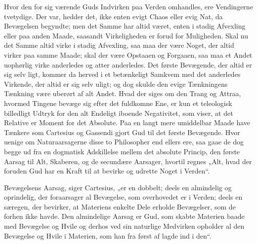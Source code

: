 \documentclass[12pt,a4paper]{book}
\begin{document}
Hvor den for sig værende Guds Indvirken paa Verden omhandles, ere
Vendingerne tvetydige. Der var, hedder det, ikke enten evigt Chaos
eller evig Nat, da Bevægelsen begyndte; men det Samme har altid været,
enten i stadig Afvexling eller paa anden Maade, saasandt Virkeligheden
er forud for Muligheden. Skal nu det Samme altid virke i stadig
Afvexling, saa maa der være Noget, der altid virker paa samme Maade;
skal der være Opstaaen og Forgaaen, saa maa et Andet uophørlig virke
anderledes og atter anderledes. Det første Bevægende, der altid er sig
selv ligt, kommer da herved i et betænkeligt Samkvem med det anderledes
Virkende, der altid er sig selv uligt; og dog skulde den evige
Tænkningens Tænkning være uberørt af alt Andet. Hvad der siges om den
Trang og Attraa, hvormed Tingene bevæge sig efter det fuldkomne Ene, er
kun et teleologisk billedligt Udtryk for den alt Endeligt iboende
Negativitet, som viser, at det Relative er Moment for det Absolute.
Paa en langt mere umiddelbar Maade have Tænkere som Cartesius og
Gassendi gjort Gud til det første Bevægende. Hvor uenige om
Naturaarsagerne disse to Philosopher end ellers ere, saa gaae de dog
begge ud fra en dogmatisk Adskillelse mellem det absolute Princip, den
første Aarsag til Alt, Skaberen, og de secundære Aarsager, hvortil
regnes „Alt, hvad der foruden Gud har en Kraft til at bevirke og
udrette Noget i Verden“.

Bevægelsens Aarsag, siger Cartesius, „er en dobbelt; deels en
almindelig og oprindelig, der foraarsager al Bevægelse, som overhovedet
er i Verden; deels en særegen, der bevirker, at Materiens enkelte Dele
erholde Bevægelser, som de forhen ikke havde. Den almindelige Aarsag er
Gud, som skabte Materien baade med Bevægelse og Hvile og derhos ved sin
naturlige Medvirken opholder al den Bevægelse og Hvile i Materien, som
han fra først af lagde ind i den“.
\end{document}
